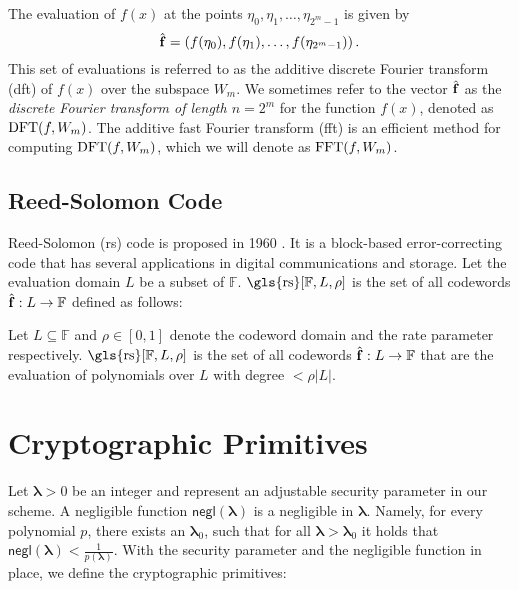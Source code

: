 \begin{definition}
	The evaluation of $f(x)$ at the points $\eta_0, \eta_1, \ldots, \eta_{2^m-1}$ is given by
	\begin{equation*}
		\hat{{\bf{f}}} = \left( f(\eta_0), f(\eta_1), \ldots, f(\eta_{2^m-1}) \right).
	\end{equation*}
	This set of evaluations is referred to as the additive discrete Fourier transform (\gls{dft}) of $f(x)$ over the subspace $W_m$. We sometimes refer to the vector $\hat{{\bf{f}}}$ as the \textit{discrete Fourier transform of length $n=2^m$} for the function $f(x)$, denoted as $\operatorname{DFT}(f, W_m)$. The additive fast Fourier transform (\gls{fft}) is an efficient method for computing $\operatorname{DFT}(f, W_m)$, which we will denote as $\operatorname{FFT}(f, W_m)$.
\end{definition}

\subsection{Reed-Solomon Code}

Reed-Solomon (\gls{rs}) code is proposed in 1960  \cite{rs-code}. It is a block-based error-correcting code that has several applications in digital communications and storage. Let the evaluation domain $L$  be a subset of $\mathbb{F}$. $\text{\gls{rs}}[\mathbb{F}, L, \rho]$ is the set of all codewords $\hat{{\bf{f}}}:L\rightarrow \mathbb{F}$ defined as follows: 


\begin{definition}\label{RScode} Let $L\subseteq\mathbb{F}$ and $\rho \in [0,1]$ denote the codeword domain and the rate parameter respectively. $\text{\gls{rs}}[\mathbb{F}, L, \rho]$ is the set of all codewords $\hat{{\bf{f}}}:L\rightarrow\mathbb{F}$ 
	that are the evaluation of polynomials over \(L\) with degree \( < \rho|L| \).
\end{definition}


\section{Cryptographic Primitives}
\label{sec:prel_Cryptographic Primitives}

Let $\boldsymbol{\lambda} > 0$ be an integer and represent an adjustable security parameter in our scheme. A negligible function $\mathsf{negl}(\boldsymbol{\lambda})$ is a negligible in $\boldsymbol{\lambda}$. Namely, for every polynomial $p$, there exists an $\boldsymbol{\lambda}_0$, such that for   all $\boldsymbol{\lambda} > \boldsymbol{\lambda}_0$ it holds that $\mathsf{negl}(\boldsymbol{\lambda})<\frac{1}{p(\boldsymbol{\lambda})}$. With the security parameter and the negligible function in place, we define the cryptographic primitives:

